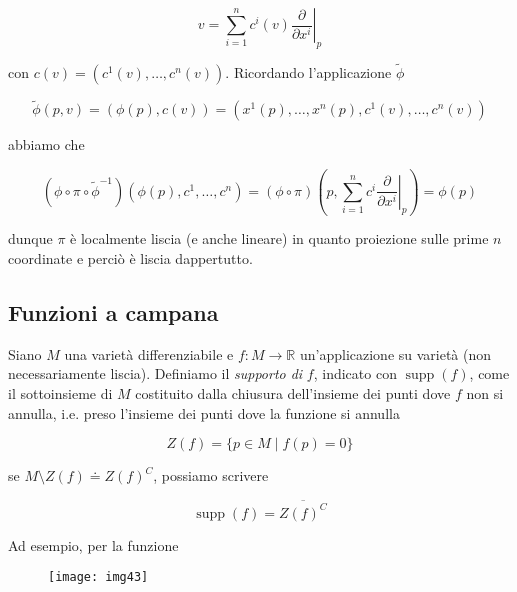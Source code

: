 \begin{equation}
	v = \sum_{i=1}^{n} c^{i}(v) \left. \dfrac{\partial}{\partial x^{i}} \right|_{p}
\end{equation}

con $ c(v) = (c^{1}(v),\dots,c^{n}(v)) $. Ricordando l'applicazione $ \tilde{\phi} $

\begin{equation}
	\tilde{\phi}(p,v) = (\phi(p),c(v)) = (x^{1}(p),\dots,x^{n}(p),c^{1}(v),\dots,c^{n}(v))
\end{equation}

abbiamo che

\begin{equation}
	(\phi \circ \pi \circ \tilde{\phi}^{-1}) (\phi(p),c^{1},\dots,c^{n}) = (\phi \circ \pi) \left( p, \sum_{i=1}^{n} c^{i} \left. \dfrac{\partial}{\partial x^{i}} \right|_{p} \right) = \phi(p)
\end{equation}

dunque $ \pi $ è localmente liscia (e anche lineare) in quanto proiezione sulle prime $ n $ coordinate e perciò è liscia dappertutto.

\subsection{Funzioni a campana}

Siano $ M $ una varietà differenziabile e $ f : M \to \mathbb{R} $ un'applicazione su varietà (non necessariamente liscia). Definiamo il \textit{supporto di} $ f $, indicato con $ \operatorname{supp}(f) $, come il sottoinsieme di $ M $ costituito dalla chiusura dell'insieme dei punti dove $ f $ non si annulla, i.e. preso l'insieme dei punti dove la funzione si annulla

\begin{equation}
	Z(f) = \{ p \in M \mid f(p) = 0 \}
\end{equation}

se $ M \setminus Z(f) \doteq Z(f)^{C} $, possiamo scrivere

\begin{equation}
	\operatorname{supp}(f) = \overline{Z(f)^{C}}
\end{equation}

Ad esempio, per la funzione 

\begin{figure}[H]
	\centering
	\texttt{[image: img43]}
\end{figure}

